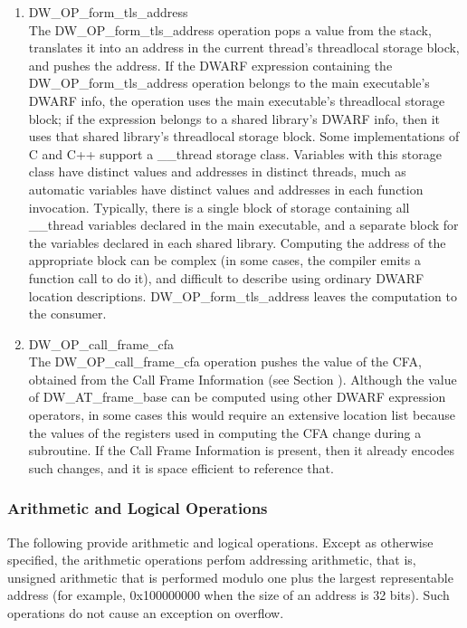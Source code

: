 \begin{enumerate}[1]
\label{chap:DWOPformtlsaddress}
\item DW\_OP\_form\_tls\_address \\
The DW\_OP\_form\_tls\_address operation pops a value from the
stack, translates it into an address in the current thread's
thread\dash local storage block, and pushes the address. If the
DWARF expression containing the DW\_OP\_form\_tls\_address
operation belongs to the main executable's DWARF info, the
operation uses the main executable's thread\dash local storage
block; if the expression belongs to a shared library's
DWARF info, then it uses that shared library's thread\dash local
storage block.  Some implementations of C and C++ support a
\_\_thread storage class. Variables with this storage class
have distinct values and addresses in distinct threads, much
as automatic variables have distinct values and addresses in
each function invocation. Typically, there is a single block
of storage containing all \_\_thread variables declared in
the main executable, and a separate block for the variables
declared in each shared library. Computing the address of
the appropriate block can be complex (in some cases, the
compiler emits a function call to do it), and difficult
to describe using ordinary DWARF location descriptions.
DW\_OP\_form\_tls\_address leaves the computation to the
consumer.

\label{chap:DWOPcallframecfa}
\item DW\_OP\_call\_frame\_cfa \\
The DW\_OP\_call\_frame\_cfa operation pushes the value of the
CFA, obtained from the Call Frame Information 
(see Section ).
Although the value of DW\_AT\_frame\_base
can be computed using other DWARF expression operators,
in some cases this would require an extensive location list
because the values of the registers used in computing the
CFA change during a subroutine. If the 
Call Frame Information 
is present, then it already encodes such changes, and it is
space efficient to reference that.
\end{enumerate}

\subsubsection{Arithmetic and Logical Operations}
The following provide arithmetic and logical operations. Except
as otherwise specified, the arithmetic operations perfom
addressing arithmetic, that is, unsigned arithmetic that is
performed modulo one plus the largest representable address
(for example, 0x100000000 when the size of an address is 32
bits). Such operations do not cause an exception on overflow.

